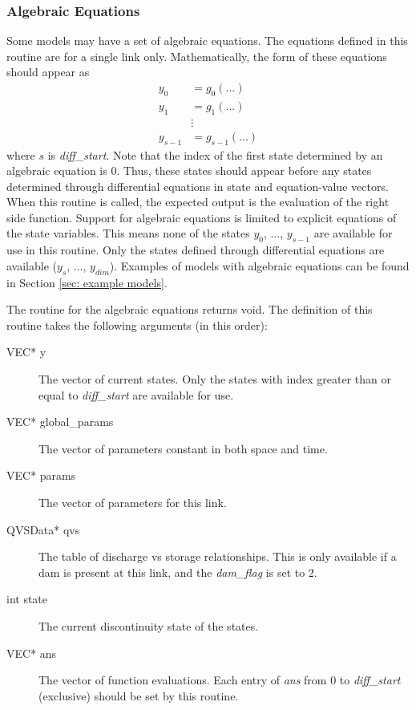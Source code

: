 \documentclass[12pt]{article}
\begin{document}
\subsubsection{Algebraic Equations} \label{sec: algebraic equations}

Some models may have a set of algebraic equations. The equations defined in this routine are for a single link only. Mathematically, the form of these equations should appear as
\begin{align*}
 y_0 &= g_0(...) \\
 y_1 &= g_1(...) \\
 &\vdots \\
 y_{s-1} &= g_{s-1}(...)
\end{align*}
where $s$ is \emph{diff\_start}. Note that the index of the first state determined by an algebraic equation is 0. Thus, these states should appear before any states determined through differential equations in state and equation-value vectors. When this routine is called, the expected output is the evaluation of the right side function. Support for algebraic equations is limited to explicit equations of the state variables. This means none of the states $y_0$, ..., $y_{s-1}$ are available for use in this routine. Only the states defined through differential equations are available ($y_s$, ..., $y_{dim}$). Examples of models with algebraic equations can be found in Section \ref{sec: example models}.

The routine for the algebraic equations returns void. The definition of this routine takes the following arguments (in this order):
\begin{description}
 \item[VEC* y] The vector of current states. Only the states with index greater than or equal to \emph{diff\_start} are available for use.
 \item[VEC* global\_params] The vector of parameters constant in both space and time.
 \item[VEC* params] The vector of parameters for this link.
 \item[QVSData* qvs] The table of discharge vs storage relationships. This is only available if a dam is present at this link, and the \emph{dam\_flag} is set to 2.
 \item[int state] The current discontinuity state of the states.
 \item[VEC* ans] The vector of function evaluations. Each entry of \emph{ans} from 0 to \emph{diff\_start} (exclusive) should be set by this routine.
\end{description}
\end{document}
